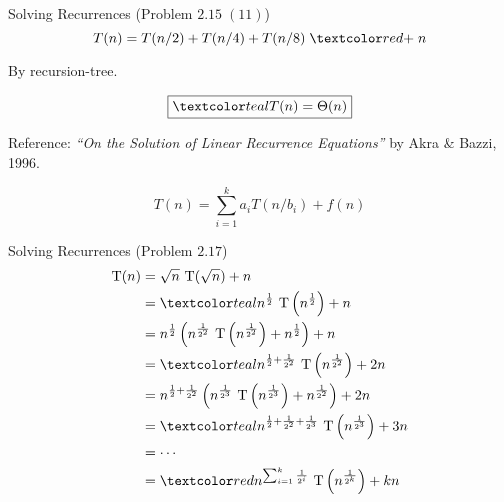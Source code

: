 \begin{frame}{}
  \begin{exampleblock}{Solving Recurrences (Problem $2.15\; (11)$)}
    \[
      T(n) = T(n/2) + T(n/4) + T(n/8) \;\red{+\; n}
    \]
  \end{exampleblock}

  \pause
  \vspace{0.30cm}
  \centerline{By recursion-tree.}
  \pause
  \[
    \boxed{\teal{T(n) = \Theta(n)}}
  \]

  \pause
  \vspace{0.50cm}
  \centerline{}

  \pause
  \begin{alertblock}{Reference:}
    {\it ``On the Solution of Linear Recurrence Equations''} by Akra \& Bazzi, 1996.

    \[
      T(n) = \sum_{i=1}^{k} a_i T(n/b_i) + f(n)
    \]
  \end{alertblock}
\end{frame}

% 
% 
% 
% 
% 

\begin{frame}{}
  \begin{exampleblock}{Solving Recurrences (Problem $2.17$)}
    \begin{align*} 
      \text{T}(n) &= \sqrt{n}\ \text{T}(\sqrt{n})+n \\
	&= \teal{n^{\frac{1}{2}}\ \text{T}\left(n^{\frac{1}{2}} \right)+n} \\
	&= n^{\frac{1}{2}}\left( n^{\frac{1}{2^2}}\ \text{T}\left(n^{\frac{1}{2^2}} \right) + n^{\frac{1}{2}} \right)+n\\
	&= \teal{n^{\frac{1}{2}+\frac{1}{2^2}}\ \text{T}\left(n^{\frac{1}{2^2}}\right) + 2n} \\
	&= n^{\frac{1}{2}+\frac{1}{2^2}}\left(n^{\frac{1}{2^3}}\ \text{T}\left(n^{\frac{1}{2^3}}\right) + n^{\frac{1}{2^2}} \right) + 2n\\
	&= \teal{n^{\frac{1}{2}+\frac{1}{2^2}+\frac{1}{2^3}}\ \text{T}\left(n^{\frac{1}{2^3}}\right) + 3n} \\ 
	&= \cdots \\ 
	&= \red{n^{\sum_{i=1}^{k}\frac{1}{2^i}}\ \text{T}\left(n^{\frac{1}{2^k}}\right) + kn} \\ 
    \end{align*}
  \end{exampleblock}
\end{frame}

